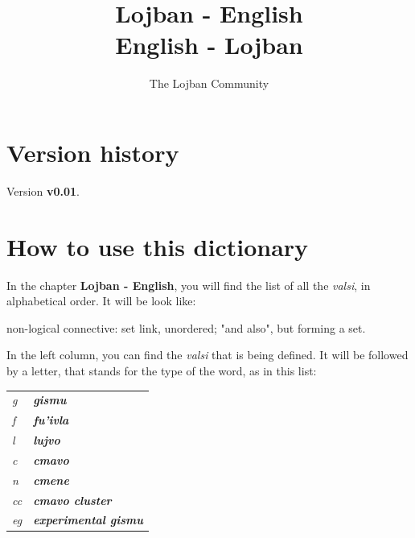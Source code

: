 \documentclass[ipa,twoside]{report}
\author{The Lojban Community}
\title{Lojban - English\\English - Lojban}
\begin{document}
\setlength{\leftfield}{0.1\textwidth}
\setlength{\rightfield}{0.3\textwidth}


\maketitle

\tableofcontents

\chapter*{Version history}
\label{cha:history}
Version {\bfseries v0.01}.

\chapter*{How to use this dictionary}
\label{cha:howto}
In the chapter \textbf{Lojban - English}, you will find the list of all the \textsl{valsi}, in alphabetical order. It will be look like:

\begin{center}
\begin{minipage}[t]{0.55\textwidth}
 	{}{}{}{non-logical connective: set link, unordered; "and also", but forming a set.}
\end{minipage}
\end{center}

In the left column, you can find the \textsl{valsi} that is being defined. It will be followed by a letter, that stands for the type of the word, as in this list:

\begin{tabular}{ l l }
  \textit{g} & \textbf{\emph{gismu}}  \\
  \textit{f} & \textbf{\emph{fu'ivla}}  \\
  \textit{l} & \textbf{\emph{lujvo}}  \\
  \textit{c} & \textbf{\emph{cmavo}} \\
  \textit{n} & \textbf{\emph{cmene}} \\
  \textit{cc} & \textbf{\emph{cmavo cluster}} \\
  \textit{eg} & \textbf{\emph{experimental gismu}} \\
\end{tabular}
\end{document}
